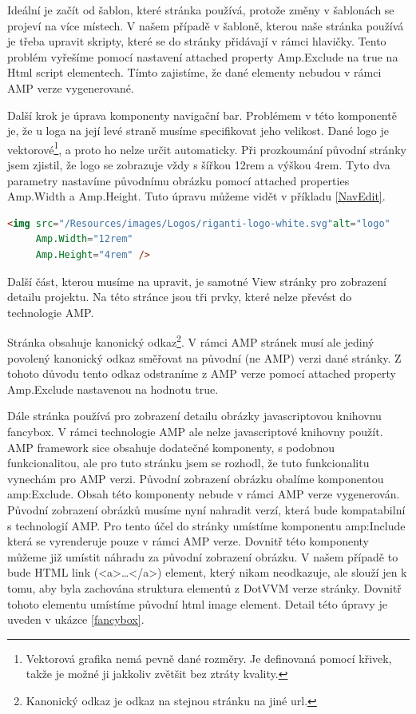 Ideální je začít od šablon, které stránka používá, protože změny v šablonách se projeví na více místech. V našem případě v šabloně, kterou naše stránka používá je třeba upravit skripty, které se do stránky přidávají v rámci hlavičky. Tento problém vyřešíme pomocí nastavení attached property Amp.Exclude na true na Html script elementech. Tímto zajistíme, že dané elementy nebudou v rámci AMP verze vygenerované.

Další krok je úprava komponenty navigační bar. Problémem v této komponentě je, že u loga na její levé straně musíme specifikovat jeho velikost. Dané logo je vektorové\footnote{Vektorová grafika nemá pevně dané rozměry. Je definovaná pomocí křivek, takže je možné ji jakkoliv zvětšit bez ztráty kvality.}, a proto ho nelze určit automaticky. Při prozkoumání původní stránky jsem zjistil, že logo se zobrazuje vždy s šířkou 12rem a výškou 4rem. Tyto dva parametry nastavíme původnímu obrázku pomocí attached properties Amp.Width a Amp.Height. Tuto úpravu můžeme vidět v příkladu \ref{NavEdit}.
\begin{lstlisting}[language=html, caption=Upřesnění velikosti obrázku.,label=NavEdit,captionpos=t]
<img src="/Resources/images/Logos/riganti-logo-white.svg"alt="logo"
     Amp.Width="12rem"
     Amp.Height="4rem" />
\end{lstlisting}

Další část, kterou musíme na upravit, je samotné View stránky pro zobrazení detailu projektu. Na této stránce jsou tři prvky, které nelze převést do technologie AMP.

Stránka obsahuje kanonický odkaz\footnote{Kanonický odkaz je odkaz na stejnou stránku na jiné url.}. V rámci AMP stránek musí ale jediný povolený kanonický odkaz směřovat na původní (ne AMP) verzi dané stránky. Z tohoto důvodu tento odkaz odstraníme z AMP verze pomocí attached property Amp.Exclude nastavenou na hodnotu true.

Dále stránka používá pro zobrazení detailu obrázky javascriptovou knihovnu fancybox. V rámci technologie AMP ale nelze javascriptové knihovny použít. AMP framework sice obsahuje dodatečné komponenty, s podobnou funkcionalitou, ale pro tuto stránku jsem se rozhodl, že tuto funkcionalitu vynechám pro AMP verzi. Původní zobrazení obrázku obalíme komponentou amp:Exclude. Obsah této komponenty nebude v rámci AMP verze vygenerován. Původní zobrazení obrázků musíme nyní nahradit verzí, která bude kompatabilní s technologií AMP. Pro tento účel do stránky umístíme komponentu amp:Include která se vyrenderuje pouze v rámci AMP verze. Dovnitř této komponenty můžeme již umístit náhradu za původní zobrazení obrázku. V našem případě to bude HTML link (<a>\ldots</a>) element, který nikam neodkazuje, ale slouží jen k tomu, aby byla zachována struktura elementů z DotVVM verze stránky. Dovnitř tohoto elementu umístíme původní html image element. Detail této úpravy je uveden v ukázce \ref{fancybox}.


